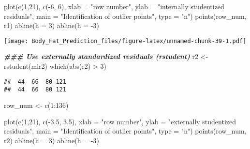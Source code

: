 \documentclass[
]{article}
\newenvironment{Shaded}{\begin{snugshade}}{\end{snugshade}}
\newcommand{\AttributeTok}[1]{\textcolor[rgb]{0.77,0.63,0.00}{#1}}
\newcommand{\DecValTok}[1]{\textcolor[rgb]{0.00,0.00,0.81}{#1}}
\newcommand{\DocumentationTok}[1]{\textcolor[rgb]{0.56,0.35,0.01}{\textbf{\textit{#1}}}}
\newcommand{\FloatTok}[1]{\textcolor[rgb]{0.00,0.00,0.81}{#1}}
\newcommand{\FunctionTok}[1]{\textcolor[rgb]{0.00,0.00,0.00}{#1}}
\newcommand{\NormalTok}[1]{#1}
\newcommand{\OtherTok}[1]{\textcolor[rgb]{0.56,0.35,0.01}{#1}}
\newcommand{\SpecialCharTok}[1]{\textcolor[rgb]{0.00,0.00,0.00}{#1}}
\newcommand{\StringTok}[1]{\textcolor[rgb]{0.31,0.60,0.02}{#1}}
\begin{document}
\begin{Shaded}
\begin{Highlighting}[]
\FunctionTok{plot}\NormalTok{(}\FunctionTok{c}\NormalTok{(}\DecValTok{1}\NormalTok{,}\DecValTok{21}\NormalTok{), }\FunctionTok{c}\NormalTok{(}\SpecialCharTok{{-}}\DecValTok{6}\NormalTok{, }\DecValTok{6}\NormalTok{), }\AttributeTok{xlab =} \StringTok{"row number"}\NormalTok{,}
     \AttributeTok{ylab =} \StringTok{"internally studentized residuals"}\NormalTok{, }
     \AttributeTok{main =} \StringTok{"Identification of outlier points"}\NormalTok{,}
     \AttributeTok{type =} \StringTok{"n"}\NormalTok{)}
\FunctionTok{points}\NormalTok{(row\_num, r1)}
\FunctionTok{abline}\NormalTok{(}\AttributeTok{h =} \DecValTok{3}\NormalTok{)}
\FunctionTok{abline}\NormalTok{(}\AttributeTok{h =} \SpecialCharTok{{-}}\DecValTok{3}\NormalTok{)}
\end{Highlighting}
\end{Shaded}

\texttt{[image: Body\_Fat\_Prediction\_files/figure-latex/unnamed-chunk-39-1.pdf]}

\begin{Shaded}
\begin{Highlighting}[]
\DocumentationTok{\#\#\# Use externally standardized residuals (rstudent)}
\NormalTok{r2 }\OtherTok{\textless{}{-}} \FunctionTok{rstudent}\NormalTok{(mlr2)}
\FunctionTok{which}\NormalTok{(}\FunctionTok{abs}\NormalTok{(r2) }\SpecialCharTok{\textgreater{}} \DecValTok{3}\NormalTok{)}
\end{Highlighting}
\end{Shaded}

\begin{verbatim}
##  44  66  80 121 
##  44  66  80 121
\end{verbatim}

\begin{Shaded}
\begin{Highlighting}[]
\NormalTok{row\_num }\OtherTok{\textless{}{-}} \FunctionTok{c}\NormalTok{(}\DecValTok{1}\SpecialCharTok{:}\DecValTok{136}\NormalTok{)}
\end{Highlighting}
\end{Shaded}

\begin{Shaded}
\begin{Highlighting}[]
\FunctionTok{plot}\NormalTok{(}\FunctionTok{c}\NormalTok{(}\DecValTok{1}\NormalTok{,}\DecValTok{21}\NormalTok{), }\FunctionTok{c}\NormalTok{(}\SpecialCharTok{{-}}\FloatTok{3.5}\NormalTok{, }\FloatTok{3.5}\NormalTok{), }\AttributeTok{xlab =} \StringTok{"row number"}\NormalTok{,}
     \AttributeTok{ylab =} \StringTok{"externally studentized residuals"}\NormalTok{, }
     \AttributeTok{main =} \StringTok{"Identification of outlier points"}\NormalTok{,}
     \AttributeTok{type =} \StringTok{"n"}\NormalTok{)}
\FunctionTok{points}\NormalTok{(row\_num, r2)}
\FunctionTok{abline}\NormalTok{(}\AttributeTok{h =} \DecValTok{3}\NormalTok{)}
\FunctionTok{abline}\NormalTok{(}\AttributeTok{h =} \SpecialCharTok{{-}}\DecValTok{3}\NormalTok{)}
\end{Highlighting}
\end{Shaded}
\end{document}

